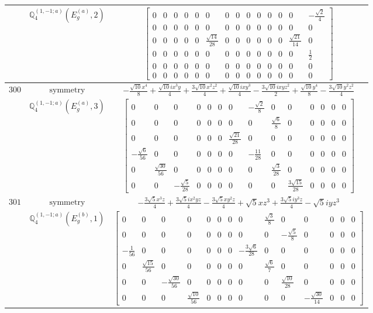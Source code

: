 \documentclass[fleqn,8pt,landscape]{jsarticle}
\begin{document}
\begin{longtable}{ccc}
$  $ & $ \mathbb{Q}_{4}^{(1,-1;a)}(E_{g}^{(a)},2) $ & $ \begin{bmatrix} 0 & 0 & 0 & 0 & 0 & 0 & 0 & 0 & 0 & 0 & 0 & 0 & 0 & - \frac{\sqrt{2}}{4} \\ 0 & 0 & 0 & 0 & 0 & 0 & 0 & 0 & 0 & 0 & 0 & 0 & 0 & 0 \\ 0 & 0 & 0 & 0 & 0 & \frac{\sqrt{14}}{28} & 0 & 0 & 0 & 0 & 0 & 0 & \frac{\sqrt{21}}{14} & 0 \\ 0 & 0 & 0 & 0 & 0 & 0 & 0 & 0 & 0 & 0 & 0 & 0 & 0 & \frac{1}{2} \\ 0 & 0 & 0 & 0 & 0 & 0 & 0 & 0 & 0 & 0 & 0 & 0 & 0 & 0 \\ 0 & 0 & 0 & 0 & 0 & 0 & 0 & 0 & 0 & 0 & 0 & 0 & 0 & 0 \end{bmatrix} $ \\ \hline
$ 300 $ & $ \text{symmetry} $ & $ - \frac{\sqrt{10} x^{4}}{8} + \frac{\sqrt{10} i x^{3} y}{4} + \frac{3 \sqrt{10} x^{2} z^{2}}{4} + \frac{\sqrt{10} i x y^{3}}{4} - \frac{3 \sqrt{10} i x y z^{2}}{2} + \frac{\sqrt{10} y^{4}}{8} - \frac{3 \sqrt{10} y^{2} z^{2}}{4} $ \\
$  $ & $ \mathbb{Q}_{4}^{(1,-1;a)}(E_{g}^{(a)},3) $ & $ \begin{bmatrix} 0 & 0 & 0 & 0 & 0 & 0 & 0 & - \frac{\sqrt{2}}{8} & 0 & 0 & 0 & 0 & 0 & 0 \\ 0 & 0 & 0 & 0 & 0 & 0 & 0 & 0 & \frac{\sqrt{6}}{8} & 0 & 0 & 0 & 0 & 0 \\ 0 & 0 & 0 & 0 & 0 & 0 & \frac{\sqrt{21}}{28} & 0 & 0 & 0 & 0 & 0 & 0 & 0 \\ - \frac{\sqrt{6}}{56} & 0 & 0 & 0 & 0 & 0 & 0 & - \frac{11}{28} & 0 & 0 & 0 & 0 & 0 & 0 \\ 0 & \frac{\sqrt{30}}{56} & 0 & 0 & 0 & 0 & 0 & 0 & \frac{\sqrt{3}}{28} & 0 & 0 & 0 & 0 & 0 \\ 0 & 0 & - \frac{\sqrt{5}}{28} & 0 & 0 & 0 & 0 & 0 & 0 & \frac{3 \sqrt{15}}{28} & 0 & 0 & 0 & 0 \end{bmatrix} $ \\ \hline
$ 301 $ & $ \text{symmetry} $ & $ - \frac{3 \sqrt{5} x^{3} z}{4} + \frac{3 \sqrt{5} i x^{2} y z}{4} - \frac{3 \sqrt{5} x y^{2} z}{4} + \sqrt{5} x z^{3} + \frac{3 \sqrt{5} i y^{3} z}{4} - \sqrt{5} i y z^{3} $ \\
$  $ & $ \mathbb{Q}_{4}^{(1,-1;a)}(E_{g}^{(b)},1) $ & $ \begin{bmatrix} 0 & 0 & 0 & 0 & 0 & 0 & 0 & 0 & \frac{\sqrt{3}}{8} & 0 & 0 & 0 & 0 & 0 \\ 0 & 0 & 0 & 0 & 0 & 0 & 0 & 0 & 0 & - \frac{\sqrt{5}}{8} & 0 & 0 & 0 & 0 \\ - \frac{1}{56} & 0 & 0 & 0 & 0 & 0 & 0 & - \frac{3 \sqrt{6}}{28} & 0 & 0 & 0 & 0 & 0 & 0 \\ 0 & \frac{\sqrt{15}}{56} & 0 & 0 & 0 & 0 & 0 & 0 & \frac{\sqrt{6}}{7} & 0 & 0 & 0 & 0 & 0 \\ 0 & 0 & - \frac{\sqrt{30}}{56} & 0 & 0 & 0 & 0 & 0 & 0 & \frac{\sqrt{10}}{28} & 0 & 0 & 0 & 0 \\ 0 & 0 & 0 & \frac{\sqrt{10}}{56} & 0 & 0 & 0 & 0 & 0 & 0 & - \frac{\sqrt{30}}{14} & 0 & 0 & 0 \end{bmatrix} $ \\ \hline

\end{longtable}
\end{document}
